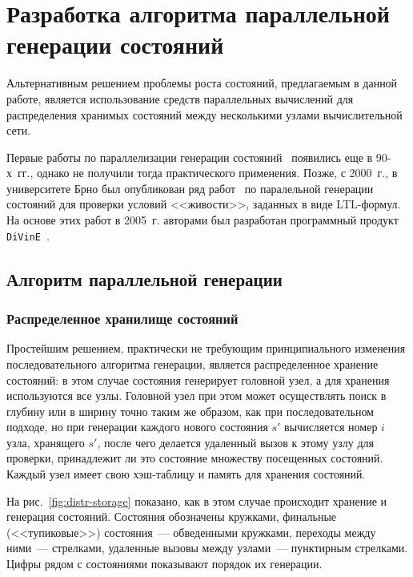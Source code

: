 \chapter{Разработка алгоритма параллельной генерации состояний}
\label{sec:par-statespace}

Альтернативным решением проблемы роста состояний, предлагаемым в данной работе, является
использование средств параллельных вычислений для распределения хранимых состояний между
несколькими узлами вычислительной сети.

Первые работы по параллелизации генерации состояний~\cite{LS99} появились еще в 90-х~гг.,
однако не получили тогда практического применения. Позже, с 2000~г., в университете Брно
был опубликован ряд работ~\cite{DLTL1,DLTL2} по паралельной генерации состояний для
проверки условий <<живости>>, заданных в виде LTL-формул. На основе этих работ в
2005~г. авторами был разработан программный продукт \texttt{DiVinE}~\cite{DiVinE}.

\section{Алгоритм параллельной генерации}
\label{sec:par-algo}

\subsection{Распределенное хранилище состояний}
\label{sec:distr-storage}

Простейшим решением, практически не требующим принципиального изменения последовательного
алгоритма генерации, является распределенное хранение состояний: в этом случае состояния
генерирует головной узел, а для хранения используются все узлы. Головной узел при этом
может осуществлять поиск в глубину или в ширину точно таким же образом, как при
последовательном подходе, но при генерации каждого нового состояния $s'$ вычисляется номер
$i$ узла, хранящего $s'$, после чего делается удаленный вызов к этому узлу для проверки,
принадлежит ли это состояние множеству  посещенных состояний. Каждый узел
имеет свою хэш-таблицу и память для хранения состояний.

На рис.~\ref{fig:distr-storage} показано, как в этом случае происходит хранение и
генерация состояний. Состояния обозначены кружками, финальные (<<тупиковые>>) состояния~---
обведенными кружками, переходы между ними~--- стрелками, удаленные вызовы между узлами~---
пунктирным стрелками. Цифры рядом с состояниями показывают порядок их генерации.

